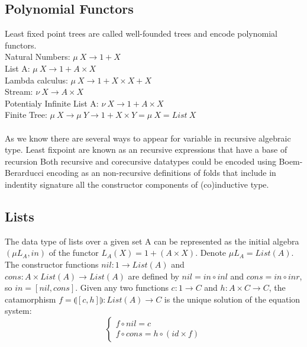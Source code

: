 \documentclass[11pt,oneside]{article}
\begin{document}
\subsection{Polynomial Functors}
Least fixed point trees are called well-founded trees and encode polynomial functors.\\

\noindent Natural Numbers: $\mu\ X \rightarrow 1 + X$\\
List A: $\mu\ X \rightarrow 1 + A \times X$\\
Lambda calculus: $\mu\ X \rightarrow 1 + X \times X + X$\\
Stream: $\nu\ X \rightarrow A \times X$\\
Potentialy Infinite List A: $\nu\ X \rightarrow 1 + A \times X$\\
Finite Tree: $\mu\ X \rightarrow \mu\ Y \rightarrow 1 + X \times Y = \mu\ X = List\ X$\\

\paragraph{}
As we know there are several ways to appear for variable in recursive algebraic type.
Least fixpoint are known as an recursive expressions that have a base of recursion
Both recursive and corecursive datatypes could be encoded using Boem-Berarducci encoding
as an non-recursive definitions of folds that include in indentity signature all the
constructor components of (co)inductive type.

\subsection{Lists}
The data type of lists over a given set A can be represented as the initial algebra
$(\mu L_A, in)$ of the functor $L_A(X) = 1 + (A \times X)$. Denote $\mu L_A = List(A)$.
The constructor functions $nil: 1 \rightarrow List(A)$ and
$cons: A \times List(A) \rightarrow List(A)$ are defined by
$nil = in \circ inl$ and $cons = in \circ inr$, so $in = [nil,cons]$.
Given any two functions $c: 1 \rightarrow C$ and $h: A \times C \rightarrow C$,
the catamorphism $f = \llparenthesis [c,h] \rrparenthesis : List(A) \rightarrow C$
is the unique solution of the equation system:
\vspace{0.3cm}
$$
\begin{cases}
  f \circ nil  = c \\
  f \circ cons = h \circ (id \times f)
\end{cases}
$$
\end{document}
